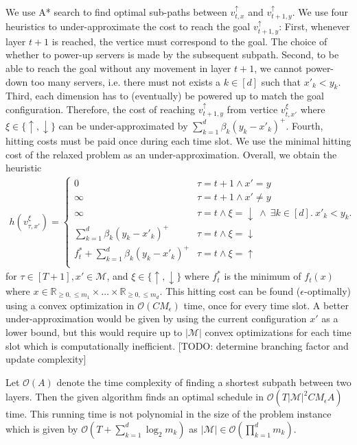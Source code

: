 We use A* search to find optimal sub-paths between $v_{t,x}^{\uparrow}$ and $v_{t+1,y}^{\uparrow}$. We use four heuristics to under-approximate the cost to reach the goal $v_{t+1,y}^{\uparrow}$: First, whenever layer $t+1$ is reached, the vertice must correspond to the goal. The choice of whether to power-up servers is made by the subsequent subpath. Second, to be able to reach the goal without any movement in layer $t+1$, we cannot power-down too many servers, i.e. there must not exists a $k \in [d]$ such that $x'_k < y_k$. Third, each dimension has to (eventually) be powered up to match the goal configuration. Therefore, the cost of reaching $v_{t+1,y}^{\uparrow}$ from vertice $v_{t,x'}^{\xi}$ where $\xi \in \{\uparrow, \downarrow\}$ can be under-approximated by $\sum_{k=1}^d \beta_k (y_k - x'_k)^+$. Fourth, hitting costs must be paid once during each time slot. We use the minimal hitting cost of the relaxed problem as an under-approximation. Overall, we obtain the heuristic \begin{align*}
    h(v_{\tau,x'}^{\xi}) = \begin{cases}
        0 & \tau = t+1 \land x' = y \\
        \infty & \tau = t+1 \land x' \neq y \\
        \infty & \tau = t \land \xi = {\downarrow}\ \land\ \exists k \in [d].\ x'_k < y_k. \\
        \sum_{k=1}^d \beta_k (y_k - x'_k)^+ & \tau = t \land \xi = {\downarrow} \\
        f_t^* + \sum_{k=1}^d \beta_k (y_k - x'_k)^+ & \tau = t \land \xi = {\uparrow} \\
    \end{cases}
\end{align*} for $\tau \in [T+1], x' \in \mathcal{M}$, and $\xi \in \{\uparrow, \downarrow\}$ where $f_t^*$ is the minimum of $f_t(x)$ where $x \in \mathbb{R}_{\geq 0, \leq m_1} \times \dots \times \mathbb{R}_{\geq 0, \leq m_d}$. This hitting cost can be found ($\epsilon$-optimally) using a convex optimization in $\mathcal{O}(C M_{\epsilon})$ time, once for every time slot. A better under-approximation would be given by using the current configuration $x'$ as a lower bound, but this would require up to $|\mathcal{M}|$ convex optimizations for each time slot which is computationally inefficient. [TODO: determine branching factor and update complexity]

Let $\mathcal{O}(A)$ denote the time complexity of finding a shortest subpath between two layers. Then the given algorithm finds an optimal schedule in $\mathcal{O}(T |\mathcal{M}|^2 C M_{\epsilon} A)$ time. This running time is not polynomial in the size of the problem instance which is given by $\mathcal{O}(T + \sum_{k=1}^d \log_2 m_k)$ as $|\mathcal{M}| \in \mathcal{O}(\prod_{k=1}^d m_k)$.

